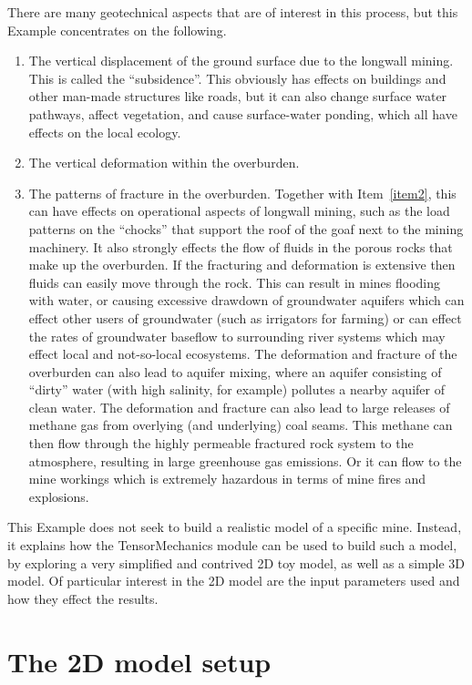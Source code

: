 \documentclass[]{scrreprt}
\begin{document}
There are many geotechnical aspects that are of interest in this
process, but this Example concentrates on the following.
\begin{enumerate}
\item The vertical displacement of the ground surface due to the
  longwall mining.  This is called the ``subsidence''.  This obviously
  has effects on buildings and other man-made structures like roads,
  but it can also change surface water pathways, affect vegetation,
  and cause surface-water ponding, which all have effects on the local
  ecology.
\item\label{item2} The vertical deformation within the overburden.
\item The patterns of fracture in the overburden.  Together with
  Item~\ref{item2}, this can have effects on operational aspects of
  longwall mining, such as the load patterns on the ``chocks'' that
  support the roof of the goaf next to the mining machinery.  It also
  strongly effects the flow of fluids in the porous rocks that make up
  the overburden.  If the fracturing and deformation is extensive then
  fluids can easily move through the rock.  This can result in mines
  flooding with water, or causing excessive drawdown of groundwater
  aquifers which can effect other users of groundwater (such as
  irrigators for farming) or can effect the rates of groundwater
  baseflow to surrounding river systems which may effect local and
  not-so-local ecosystems.  The deformation and fracture of the
  overburden can also lead to aquifer mixing, where an aquifer
  consisting of ``dirty'' water (with high salinity, for example)
  pollutes a nearby aquifer of clean water.  The deformation and
  fracture can also lead to large releases of methane gas from
  overlying (and underlying) coal seams.  This methane can then flow
  through the highly permeable fractured rock system to the
  atmosphere, resulting in large greenhouse gas emissions.  Or it can
  flow to the mine workings which is extremely hazardous in terms of
  mine fires and explosions.
\end{enumerate}

This Example does not seek to build a realistic model of a specific
mine.  Instead, it explains how the TensorMechanics module can be used
to build such a model, by exploring a very simplified and contrived 2D
toy model, as well as a simple 3D model.  Of particular interest in
the 2D model are the input parameters used and how they effect the
results.

\chapter{The 2D model setup}
\label{m.d.chap}
\end{document}
